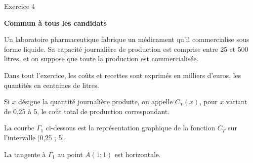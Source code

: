 
%
\begin{h2}Exercice 4\end{h2}
\par
\textbf{Commun  à tous les candidats}
\par
Un laboratoire pharmaceutique fabrique un médicament qu'il commercialise sous forme liquide. Sa capacité journalière de production est comprise entre 25 et 500 litres, et on suppose que toute la production est commercialisée.
\par
Dans tout l'exercice, les coûts et recettes sont exprimés en milliers d'euros, les quantités en centaines de litres.
\par
Si $x$ désigne la quantité journalière produite, on appelle $C_{T}\left(x\right)$, pour $x$ variant de 0,25 à 5, le coût total de production correspondant.
\par
La courbe $\Gamma _{1}$ ci-dessous est la représentation graphique de la fonction $C_{T}$ sur l'intervalle [0,25 ; 5].
\par
La tangente à $\Gamma _{1}$ au point $A\left(1 ; 1\right)$ est horizontale.

\begin{center}
\end{center}


